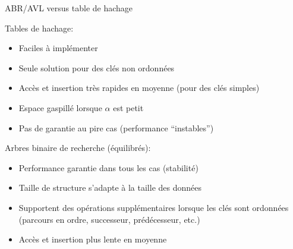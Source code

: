 \begin{frame}{ABR/AVL versus table de hachage}

Tables de hachage:
\begin{itemize}
\item Faciles à implémenter
\item Seule solution pour des clés non ordonnées
\item Accès et insertion très rapides en moyenne (pour des clés simples)
\item Espace gaspillé lorsque $\alpha$ est petit
\item Pas de garantie au pire cas (performance ``instables'')
\end{itemize}

\bigskip

Arbres binaire de recherche (équilibrés):
\begin{itemize}
\item Performance garantie dans tous les cas (stabilité)
\item Taille de structure s'adapte à la taille des données
\item Supportent des opérations supplémentaires lorsque les clés sont ordonnées (parcours en ordre, successeur, prédécesseur, etc.)
\item Accès et insertion plus lente en moyenne
\end{itemize}

\end{frame}






